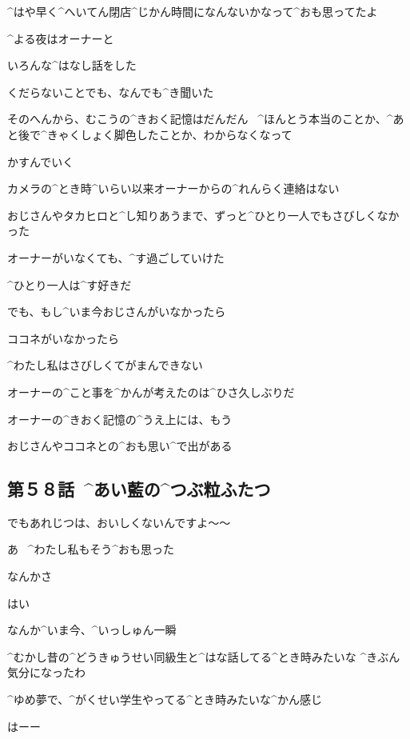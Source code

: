 \Alpha ^{はや}{早}く^{へいてん}{閉店}^{じかん}{時間}になんないかなって^{おも}{思}ってたよ

\page[36]
\Alpha ^{よる}{夜}はオーナーと

\Alpha いろんな^{はなし}{話}をした

\Alpha くだらないことでも、なんでも^{き}{聞}いた

\Alpha そのへんから、むこうの^{きおく}{記憶}はだんだん
\ ^{ほんとう}{本当}のことか、^{あと}{後}で^{きゃくしょく}{脚色}したことか、わからなくなって

\Alpha かすんでいく

\page[38]
\Alpha カメラの^{とき}{時}^{いらい}{以来}オーナーからの^{れんらく}{連絡}はない

\page[39]
\Alpha おじさんやタカヒロと^{し}{知}りあうまで、ずっと^{ひとり}{一人}でもさびしくなかった

\Alpha オーナーがいなくても、^{す}{過}ごしていけた

\Alpha ^{ひとり}{一人}は^{す}{好}きだ

\Alpha でも、もし^{いま}{今}おじさんがいなかったら

\Alpha ココネがいなかったら

\Alpha ^{わたし}{私}はさびしくてがまんできない

\page[40]
\Alpha オーナーの^{こと}{事}を^{かんが}{考}えたのは^{ひさ}{久}しぶりだ

\Alpha オーナーの^{きおく}{記憶}の^{うえ}{上}には、もう

\Alpha おじさんやココネとの^{おも}{思}い^{で}{出}がある


\subsection{第５８話\ ^{あい}{藍}の^{つぶ}{粒}ふたつ}

\page[43]
\Alpha でもあれじつは、おいしくないんですよ〜〜

\Sensei あ
\ ^{わたし}{私}もそう^{おも}{思}った

\page[44]
\Sensei なんかさ

\Alpha はい

\Sensei なんか^{いま}{今}、^{いっしゅん}{一瞬}

\Sensei ^{むかし}{昔}の^{どうきゅうせい}{同級生}と^{はな}{話}してる^{とき}{時}みたいな
^{きぶん}{気分}になったわ

\Sensei ^{ゆめ}{夢}で、^{がくせい}{学生}やってる^{とき}{時}みたいな^{かん}{感}じ

\Alpha はーー

